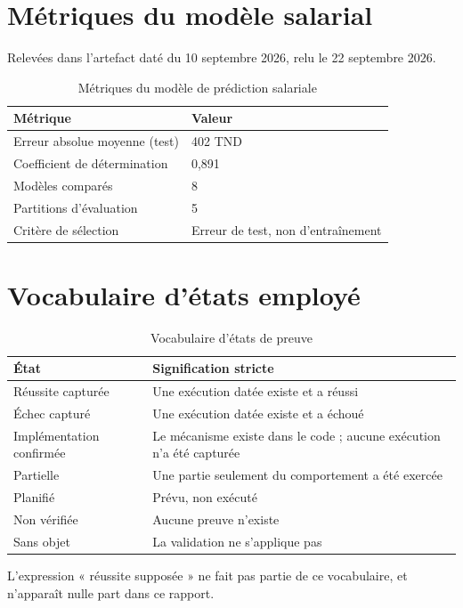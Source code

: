 \section{Métriques du modèle salarial}

Relevées dans l'artefact daté du 10 septembre 2026, relu le 22 septembre 2026.

\begin{table}[htbp]
  \centering
  \caption{Métriques du modèle de prédiction salariale}
  \label{tab:campaign_model}
  \begin{tabularx}{\textwidth}{L{6.0cm} X}
    \toprule
    \textbf{Métrique} & \textbf{Valeur} \\
    \midrule
    Erreur absolue moyenne (test) & 402 TND \\
    Coefficient de détermination  & 0,891 \\
    Modèles comparés              & 8 \\
    Partitions d'évaluation       & 5 \\
    Critère de sélection          & Erreur de test, non d'entraînement \\
    \bottomrule
  \end{tabularx}
\end{table}

\section{Vocabulaire d'états employé}

\begin{table}[htbp]
  \centering
  \caption{Vocabulaire d'états de preuve}
  \label{tab:campaign_vocab}
  \begin{tabularx}{\textwidth}{L{4.6cm} X}
    \toprule
    \textbf{État} & \textbf{Signification stricte} \\
    \midrule
    Réussite capturée        & Une exécution datée existe et a réussi \\
    Échec capturé            & Une exécution datée existe et a échoué \\
    Implémentation confirmée & Le mécanisme existe dans le code ; aucune exécution n'a été capturée \\
    Partielle                & Une partie seulement du comportement a été exercée \\
    Planifié                 & Prévu, non exécuté \\
    Non vérifiée             & Aucune preuve n'existe \\
    Sans objet               & La validation ne s'applique pas \\
    \bottomrule
  \end{tabularx}
\end{table}

L'expression « réussite supposée » ne fait pas partie de ce vocabulaire, et
n'apparaît nulle part dans ce rapport.
